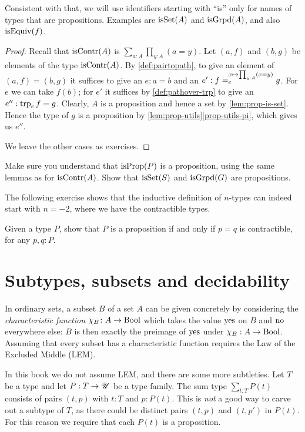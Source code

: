 Consistent with that, we will use identifiers starting with ``is'' only for names of types 
that are propositions. Examples are $\isset(A)$ and $\isgrpd(A)$,
and also $\isEq(f)$.

\begin{proof}
Recall that $\iscontr(A)$ is $\sum_{a:A} \prod_{y:A} (a=y)$.
Let $(a,f)$ and $(b,g)$ be elements of the type $\iscontr(A)$.
By \cref{def:pairtopath}, to give an element of $(a,f) = (b,g)$ it suffices 
to give an $e : a=b$ and an $e' : \pathover{f}{x\mapsto\prod_{y:A} (x=y)}{e}{g}$.
For $e$ we can take $f(b)$; for $e'$ it suffices by \cref{def:pathover-trp}
to give an $e'' : \trp e f = g$. Clearly, $A$ is a proposition and hence
a set by \cref{lem:prop-is-set}. Hence the type of $g$ is a proposition
by \cref{lem:prop-utils}\ref{prop-utils-pi}, which gives us $e''$.

We leave the other cases as exercises.
\end{proof}

\begin{xca}\label{xca:isX-is-prop}
Make sure you understand that $\isprop(P)$ is a proposition,
using the same lemmas as for $\iscontr(A)$.
Show that $\isset(S)$ and $\isgrpd(G)$ are propositions.
\end{xca}

The following exercise shows that the inductive definition of $n$-types can
indeed start with $n=-2$, where we have the contractible types.

\begin{xca}\label{xca:prop-contractible=}
Given a type $P$, show that $P$ is a proposition if and only if $p=q$ is contractible,
for any $p, q: P$.
\end{xca}

\section{Subtypes, subsets and decidability}
\label{sec:subtype}

In ordinary sets, a subset $B$ of a set $A$ can be given concretely by 
considering the \emph{characteristic function} $\chi_B\colon A\to\mathrm{Bool}$ 
which takes the value $\mathrm{yes}$ on $B$ and $\mathrm{no}$ everywhere else: 
$B$ is then exactly the preimage of $\mathrm{yes}$ under $\chi_B: A\to\mathrm{Bool}$.
Assuming that every subset has a characteristic function
requires the Law of the Excluded Middle (LEM).

In this book we do not assume LEM, and there are some more subtleties. 
Let $T$ be a type and let $P: T\to{\mathscr{U}}$ be a type family.
The sum type $\sum_{t:T} P(t)$ consists of pairs $(t,p)$ with
$t:T$ and $p:P(t)$. This is \emph{not} a good way to carve out a subtype
of $T$, as there could be distinct pairs $(t,p)$ and $(t,p')$ in $P(t)$.
For this reason we require that each $P(t)$ is a proposition.

